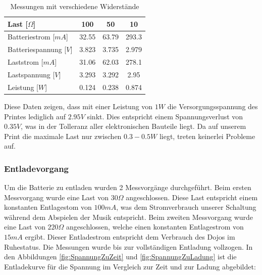 \begin{table}[h]
\centering
\label{messungen_Energie}
\begin{tabular}{|l|c|c|c|}
\hline
Last [$\Omega$]     & 100   & 50    & 10    \\ \hline
Batteriestrom [$mA$]    & 32.55 & 63.79 & 293.3 \\ \hline
Batteriespannung [$V$] & 3.823 & 3.735 & 2.979 \\ \hline
Laststrom [$mA$] & 31.06 & 62.03 & 278.1 \\ \hline
Lastspannung [$V$]  & 3.293 & 3.292 & 2.95  \\ \hline
Leistung [$W$]  & 0.124 & 0.238 & 0.874  \\ \hline
\end{tabular}
\caption{Messungen mit verschiedene Widerstände}
\end{table}

Diese Daten zeigen, dass mit einer Leistung von $1W$ die Versorgungsspannung des Printes lediglich auf $2.95V$ sinkt. Dies entspricht einem Spannungsverlust von  $0.35V$, was in der Tolleranz aller elektronischen Bauteile liegt. Da auf unserem Print die maximale Last nur zwischen $0.3 - 0.5W$ liegt, treten keinerlei Probleme auf.
\newpage


\subsubsection*{Entladevorgang}
Um die Batterie zu entladen wurden 2 Messvorgänge durchgeführt. Beim ersten Messvorgang wurde eine Last von $30\Omega$ angeschlossen. Diese Last entspricht einem konstanten Entlagestom von $100mA$, was dem Stromverbrauch unserer Schaltung während dem Abspielen der Musik entspricht. Beim zweiten Messvorgang wurde eine Last von $220\Omega$ angeschlossen, welche einen konstanten Entlagestrom von $15mA$ ergibt. Dieser Entladestrom entspricht dem Verbrauch des Dojos im Ruhestatus. Die Messungen wurde bis zur vollständigen Entladung vollzogen. 
In den Abbildungen \ref{fig:SpannungZuZeit} und  \ref{fig:SpannungZuLadung} ist die Entladekurve für die Spannung im Vergleich zur Zeit und zur Ladung abgebildet:

